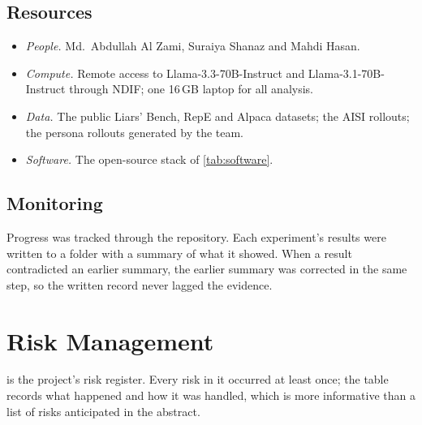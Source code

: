 \subsection{Resources}

\begin{itemize}[leftmargin=1.2em, itemsep=2pt]
\item \emph{People.} Md.\ Abdullah Al Zami, Suraiya Shanaz and Mahdi Hasan.
\item \emph{Compute.} Remote access to Llama-3.3-70B-Instruct and Llama-3.1-70B-Instruct through
  NDIF; one 16\,GB laptop for all analysis.
\item \emph{Data.} The public Liars' Bench, RepE and Alpaca datasets; the AISI rollouts; the persona
  rollouts generated by the team.
\item \emph{Software.} The open-source stack of \cref{tab:software}.
\end{itemize}

\subsection{Monitoring}

Progress was tracked through the repository. Each experiment's results were written to a folder
with a summary of what it showed. When a result contradicted an earlier summary, the earlier summary
was corrected in the same step, so the written record never lagged the evidence.

\section{Risk Management}
\label{sec:risk}

 is the project's risk register. Every risk in it occurred at least once; the table
records what happened and how it was handled, which is more informative than a list of risks
anticipated in the abstract.

